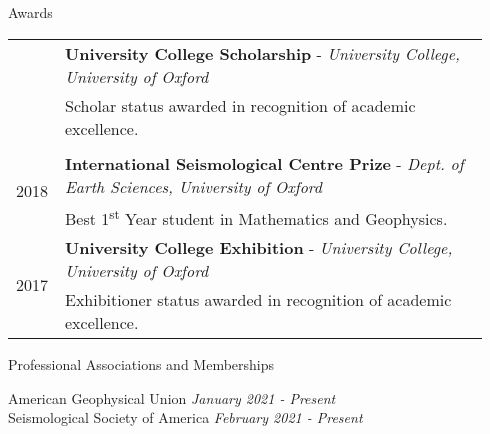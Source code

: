 \documentclass{resume}
\begin{document}
\begin{rSection}{Awards}
\begin{tabular}{p{0.07\linewidth} | p{0.87\linewidth}}
& \textbf{University College Scholarship} - \textit{University College, University of Oxford} \\ & \hspace{0.7cm} Scholar status awarded in recognition of academic excellence. \\ 
\\
\multirow{2}{*}{2018} & \textbf{International Seismological Centre Prize } - \textit{Dept. of Earth Sciences, University of Oxford} \\ & \hspace{0.7cm} Best 1\textsuperscript{st} Year student in Mathematics and Geophysics.

\\
\multirow{2}{*}{2017} & \textbf{University College Exhibition} - \textit{University College, University of Oxford} \\ & \hspace{0.7cm} Exhibitioner status awarded in recognition of academic excellence. \\ 


\end{tabular}
\end{rSection}

\vspace{0.2cm}
\begin{rSection}{Professional Associations and Memberships}

{American Geophysical Union} \hfill {\em January 2021 - Present} \\
{Seismological Society of America} \hfill {\em February 2021 - Present} 
\end{rSection}
\end{document}

